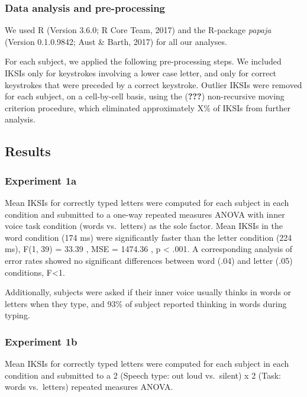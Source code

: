 \documentclass[,man,floatsintext]{apa6}
\begin{document}
\hypertarget{data-analysis-and-pre-processing}{%
\subsubsection{Data analysis and pre-processing}\label{data-analysis-and-pre-processing}}

We used R (Version 3.6.0; R Core Team, 2017) and the R-package \emph{papaja} (Version 0.1.0.9842; Aust \& Barth, 2017) for all our analyses.

For each subject, we applied the following pre-processing steps. We included IKSIs only for keystrokes involving a lower case letter, and only for correct keystrokes that were preceded by a correct keystroke. Outlier IKSIs were removed for each subject, on a cell-by-cell basis, using the ({\textbf{???}}) non-recursive moving criterion procedure, which eliminated approximately X\% of IKSIs from further analysis.

\hypertarget{results}{%
\subsection{Results}\label{results}}

\hypertarget{experiment-1a}{%
\subsubsection{Experiment 1a}\label{experiment-1a}}

Mean IKSIs for correctly typed letters were computed for each subject in each condition and submitted to a one-way repeated measures ANOVA with inner voice task condition (words vs.~letters) as the sole factor. Mean IKSIs in the word condition (174 ms) were significantly faster than the letter condition (224 ms), F(1, 39) = 33.39 , MSE = 1474.36 , p \textless{} .001. A corresponding analysis of error rates showed no significant differences between word (.04) and letter (.05) conditions, F\textless{}1.

Additionally, subjects were asked if their inner voice usually thinks in words or letters when they type, and 93\% of subject reported thinking in words during typing.

\hypertarget{experiment-1b}{%
\subsubsection{Experiment 1b}\label{experiment-1b}}

Mean IKSIs for correctly typed letters were computed for each subject in each condition and submitted to a 2 (Speech type: out loud vs.~silent) x 2 (Task: words vs.~letters) repeated measures ANOVA.
\end{document}
